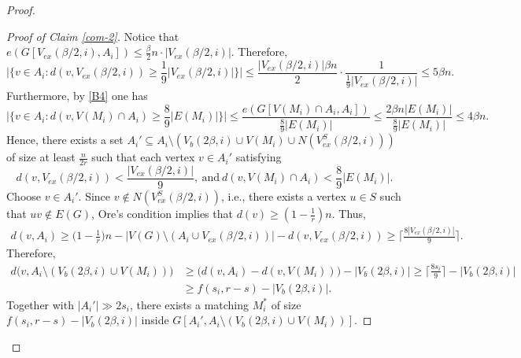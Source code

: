 \documentclass[11pt, a4paper]{article}
\theoremstyle{definition}
\newcommand{\<}{\subseteq}
\begin{document}
\begin{proof}
\begin{proof}[Proof of Claim \ref{com-2}]
 


Notice that $e(G[V_{ex}(\beta/2,i), A_i])\le \frac{\beta}{2}n \cdot |V_{ex}(\beta/2,i)|.$ 
Therefore, %
$$\Big|\big\{v\in A_i:d(v, V_{ex}(\beta/2,i))\ge \frac{1}{9}|V_{ex}(\beta/2,i)|\big\}\Big|\leq \frac{|V_{ex}(\beta/2,i)|\beta n}{2}\cdot{\frac{1}{\frac{1}{9}|V_{ex}(\beta/2,i)|}}\le 5 \beta n.$$ 
Furthermore, by \ref{B4} one has 
$$
\Big|\{v\in A_i:d(v, V(M_i)\cap A_i) \ge \frac{8}{9}|E(M_i)|\}\Big|\leq \frac{e(G[V(M_i)\cap A_i, A_i])}{\frac{8}{9}|E(M_i)|}\leq \frac{2\beta n|E(M_i)|} {\frac{8}{9}|E(M_i)|}\le 4\beta n.
$$
Hence, there exists a set $A_i'\subseteq A_i\setminus (V_b(2\beta, i)\cup V(M_i)\cup N(V_{ex}^S(\beta/2,i)))$ of size at least $\frac{n}{2r}$ such that each vertex $v\in A_i'$ satisfying  
$$
d(v, V_{ex}(\beta/2,i))<\frac{|V_{ex}(\beta/2,i)|}{9},\ \text{and}\ 
d(v, V(M_i)\cap A_i)<\frac{8}{9}|E(M_i)|.
$$ %
Choose $v\in A_i'$. Since $v\notin N(V_{ex}^S(\beta/2,i))$, i.e., there exists a vertex $u\in S$ such that $uv\notin E(G)$, Ore's condition implies that 
$d(v)\ge (1-\frac{1}{r})n$. 
Thus, 
 \begin{align*}
     d(v, A_i)\geq \Big(1-\frac{1}{r}\Big)n-\big|V(G)\setminus (A_i\cup V_{ex}({\beta}/2,i))\big|-d(v,V_{ex}({\beta}/2,i))\ge \Big \lceil \frac{8 |V_{ex}(\beta/2,i)|}{9}\Big \rceil.
 \end{align*}
Therefore, 
\begin{align*}
    d\big(v, A_i \setminus (V_b(2\beta, i)\cup V(M_i))\big)&\ge \big(d(v, A_i)-d(v,V(M_i))\big)-|V_b(2\beta,i)|\geq \Big \lceil \frac{8 s_i}{9}\Big \rceil-|V_b(2\beta,i)|\\
    &\ge f(s_i,r-s)-|V_{b}(2\beta,i)|.
\end{align*}
Together with $|A_i'|\gg 2s_i$, there exists a matching $M_i^*$ of size $f(s_i,r-s)-|V_{b}(2\beta, i)|$ inside $G[A_i',A_i \setminus (V_b(2\beta, i)\cup V(M_i))]$. %



\end{proof}
\end{proof}
\end{document}
